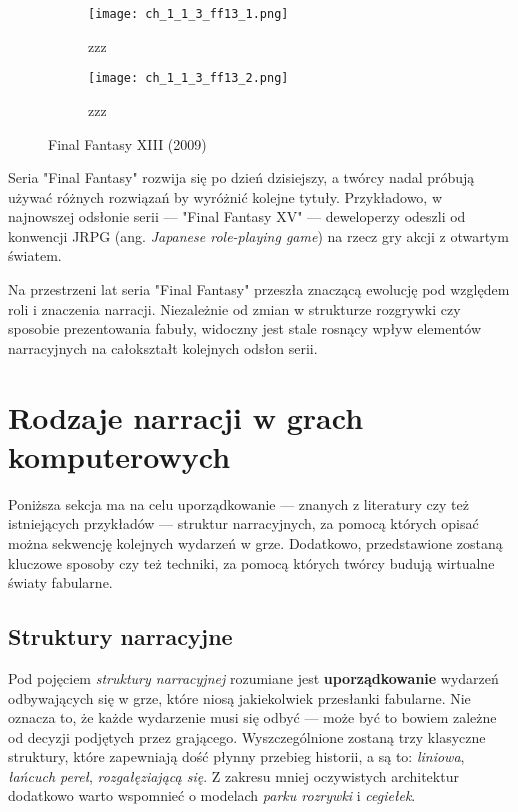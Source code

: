 \begin{figure}[h]
	\begin{subfigure}{0.49\textwidth}
		\caption{zzz}
		\texttt{[image: ch\_1\_1\_3\_ff13\_1.png]}
		\label{subfig:ch_1_1_3_ff13_1}
	\end{subfigure}
	\begin{subfigure}{0.49\textwidth}
		\caption{zzz}
		\texttt{[image: ch\_1\_1\_3\_ff13\_2.png]}
		\label{subfig:ch_1_1_3_ff13_2}
	\end{subfigure}
	\caption{Final Fantasy XIII (2009)}
	\label{fig:ch1_1_3_ff13}
\end{figure}

Seria "Final Fantasy" rozwija się po dzień dzisiejszy, a twórcy nadal próbują używać różnych rozwiązań by
wyróżnić kolejne tytuły. Przykładowo, w najnowszej odsłonie serii --- "Final Fantasy XV" --- deweloperzy
odeszli od konwencji JRPG (ang. \textit{Japanese role-playing game}) na rzecz gry akcji z otwartym światem.

Na przestrzeni lat seria "Final Fantasy" przeszła znaczącą ewolucję pod względem roli i znaczenia narracji.
Niezależnie od zmian w strukturze rozgrywki czy sposobie prezentowania fabuły, widoczny jest stale rosnący
wpływ elementów narracyjnych na całokształt kolejnych odsłon serii.

\newpage

\section{Rodzaje narracji w grach komputerowych}\label{section:ch1_2}

Poniższa sekcja ma na celu uporządkowanie --- znanych z literatury czy też istniejących
przykładów --- struktur narracyjnych, za pomocą których opisać można sekwencję kolejnych
wydarzeń w grze. Dodatkowo, przedstawione zostaną kluczowe sposoby czy też techniki, za
pomocą których twórcy budują wirtualne światy fabularne.

\subsection{Struktury narracyjne}\label{subsection:ch1_2_1}

Pod pojęciem \textit{struktury narracyjnej} rozumiane jest \textbf{uporządkowanie}
wydarzeń odbywających się w grze, które niosą jakiekolwiek przesłanki fabularne.
Nie oznacza to, że każde wydarzenie musi się odbyć --- może być to bowiem zależne od
decyzji podjętych przez grającego. Wyszczególnione zostaną trzy klasyczne struktury,
które zapewniają dość płynny przebieg historii, a są to: \textit{liniowa}, \textit{łańcuch pereł},
\textit{rozgałęziającą się}\cite{the_evolution_of_video_games}\cite{theorising_narrative}\cite{narrative_structures}.
Z zakresu mniej oczywistych architektur dodatkowo warto wspomnieć o modelach
\textit{parku rozrywki} i \textit{cegiełek}\cite{theorising_narrative}.

